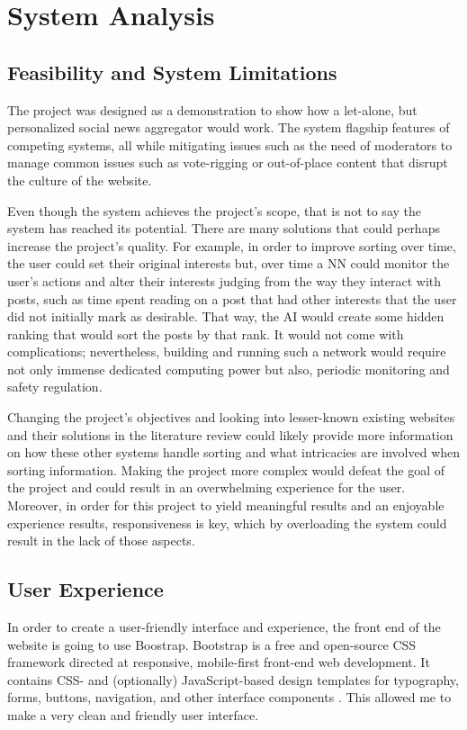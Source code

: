 
\chapter{System Analysis}

\section{Feasibility and System Limitations}
The project was designed as a demonstration to show how a let-alone, but personalized social news aggregator would work. The system flagship features of competing systems, all while mitigating issues such as the need of moderators to manage common issues such as vote-rigging or out-of-place content that disrupt the culture of the website.

Even though the system achieves the project's scope, that is not to say the system has reached its potential. There are many solutions that could perhaps increase the project's quality. For example, in order to improve sorting over time, the user could set their original interests but, over time a NN could monitor the user's actions and alter their interests judging from the way they interact with posts, such as time spent reading on a post that had other interests that the user did not initially mark as desirable. That way, the AI would create some hidden ranking that would sort the posts by that rank. It would not come with complications; nevertheless, building and running such a network would require not only immense dedicated computing power but also, periodic monitoring and safety regulation.

Changing the project's objectives and looking into lesser-known existing websites and their solutions in the literature review could likely provide more information on how these other systems handle sorting and what intricacies are involved when sorting information. Making the project more complex would defeat the goal of the project and could result in an overwhelming experience for the user. Moreover, in order for this project to yield meaningful results and an enjoyable experience results, responsiveness is key, which by overloading the system could result in the lack of those aspects.

\section{User Experience}
In order to create a user-friendly interface and experience, the front end of the website is going to use Boostrap. Bootstrap is a free and open-source CSS framework directed at responsive, mobile-first front-end web development. It contains CSS- and (optionally) JavaScript-based design templates for typography, forms, buttons, navigation, and other interface components \cite{wikipediacontributors_2019_bootstrap}. This allowed me to make a very clean and friendly user interface.

